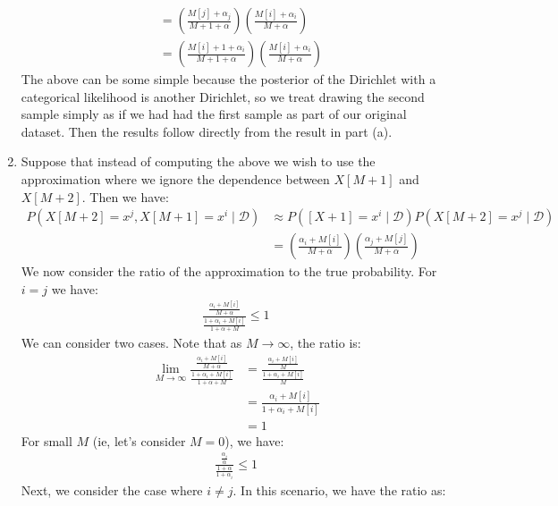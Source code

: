 \documentclass[12pt]{article}
\begin{document}
\begin{enumerate}[label=(\alph*)]
\begin{align*}
  	&= \left(\frac{M[j] + \alpha_j}{M + 1+ \alpha}\right)\left(\frac{M[i] + \alpha_i}{M + \alpha}\right) \tag{In the case where $i \neq j$} \\
  	&= \left(\frac{M[i] + 1 + \alpha_i}{M + 1+ \alpha}\right)\left(\frac{M[i] + \alpha_i}{M + \alpha}\right) \tag{In the case where $i = j$}
  \end{align*}
  The above can be some simple because the posterior of the Dirichlet with a categorical likelihood is another Dirichlet, so we treat drawing the second sample simply as if we had had the first sample as part of our original dataset. Then the results follow directly from the result in part (a).

  \item Suppose that instead of computing the above we wish to use the approximation where we ignore the dependence between $X[M+1]$ and $X[M+2]$. Then we have:
  \begin{align*}
  	P(X[M+2] = x^j, X[M+1] = x^i \mid \mathcal{D}) &\approx P([X+1] = x^i \mid \mathcal{D})P(X[M+2] = x^j \mid \mathcal{D}) \\
  	&= \left(\frac{\alpha_i + M[i]}{M + \alpha}\right)\left(\frac{\alpha_j + M[j]}{M + \alpha}\right) \tag{results from (a)}
  \end{align*}
  We now consider the ratio of the approximation to the true probability. For $i = j$ we have:
  \begin{align*}
  	\frac{\frac{\alpha_i + M[i]}{M + \alpha}}{\frac{1 + \alpha_i + M[i]}{1 + \alpha + M}} \leq 1 \tag{since $\alpha_i + M[i] \leq \alpha + M$}
  \end{align*}
  We can consider two cases. Note that as $M \to \infty$, the ratio is:
  \begin{align*}
  	\lim_{M \to \infty} \frac{\frac{\alpha_i + M[i]}{M + \alpha}}{\frac{1 + \alpha_i + M[i]}{1 + \alpha + M}} &= \frac{\frac{\alpha_i + M[i]}{M}}{\frac{1 + \alpha_i + M[i]}{M}} \\
  	&= \frac{\alpha_i + M[i]}{1 + \alpha_i + M[i]} \\
  	&= 1 \tag{if we further assume that $x^i$ is generated with a non-zero probability}
  \end{align*}
  For small $M$ (ie, let's consider $M = 0$), we have:
  \begin{align*}
  \frac{\frac{\alpha_i}{\alpha}}{\frac{1 + \alpha}{1 + \alpha_i}} \leq 1 \tag{since $\alpha_i \leq \alpha$}
  \end{align*}
  Next, we consider the case where $i \neq j$. In this scenario, we have the ratio as:

\end{enumerate}
\end{document}
